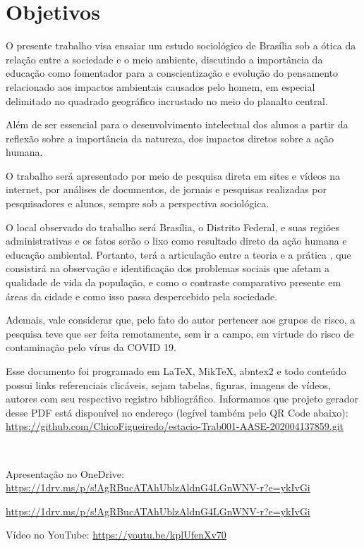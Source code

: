 \chapter{Objetivos}

O presente trabalho visa ensaiar um estudo sociológico de Brasília sob a ótica da relação entre a sociedade e o meio ambiente, discutindo a importância da educação como fomentador para a conscientização e evolução do pensamento relacionado aos impactos ambientais causados pelo homem, em especial delimitado no quadrado geográfico incrustado no meio do planalto central.

Além de ser essencial para o desenvolvimento intelectual dos alunos a partir da reflexão sobre a importância da natureza, dos impactos diretos sobre a ação humana.

O trabalho será apresentado por meio de pesquisa direta em sites e vídeos na internet, por análises de documentos, de jornais e pesquisas realizadas por pesquisadores e alunos, sempre sob a perspectiva sociológica.

O local observado do trabalho será Brasília, o Distrito Federal, e suas regiões administrativas e os fatos serão o lixo como resultado direto da ação humana e educação ambiental. Portanto, terá a articulação entre a teoria e a prática , que consistirá na observação e identificação dos problemas sociais que afetam a qualidade de vida da população, e como o contraste comparativo presente em áreas da cidade e como isso passa despercebido pela sociedade.

Ademais, vale considerar que, pelo fato do autor pertencer aos grupos de risco, a pesquisa teve que ser feita remotamente, sem ir a campo, em virtude do risco de contaminação pelo vírus da COVID 19.


Esse documento foi programado em \LaTeX, MikTeX, abntex2 e todo conteúdo possui links referenciais clicáveis, sejam tabelas, figuras, imagens de vídeos, autores com seu respectivo registro bibliográfico.
Informamos que projeto gerador desse PDF está disponível no endereço (legível também pelo QR Code abaixo): \\
\url{https://github.com/ChicoFigueiredo/estacio-Trab001-AASE-202004137859.git} \\
\begin{center}
     \\
\end{center}


Apresentação no OneDrive: \url{https://1drv.ms/p/s!AgRBucATAhUblzAldnG4LGnWNV-r?e=ykIvGi} \\
\begin{center}
    \url{https://1drv.ms/p/s!AgRBucATAhUblzAldnG4LGnWNV-r?e=ykIvGi}{
    }
\end{center}




Vídeo no YouTube: \url{https://youtu.be/kplUfenXv70} \\
\begin{center}
\end{center}
